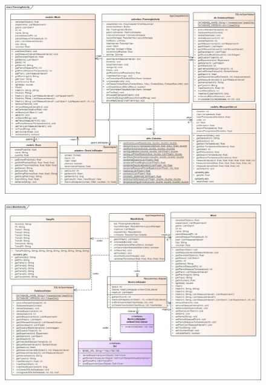             \begin{figure}
                \centering
                \includegraphics[scale=0.5, angle=90]{Anexo/DiagramasClase/PlanningActivity.jpg}
                \label{fig:DiagClasePlanningActivity}
            \end{figure}
    
    
    \begin{figure}
        \centering
        \includegraphics[scale=0.5, angle =90]{Anexo/DiagramasClase/MainActivity.jpg}
        \label{fig:DiagClaseMainActivity}
    \end{figure}
    
